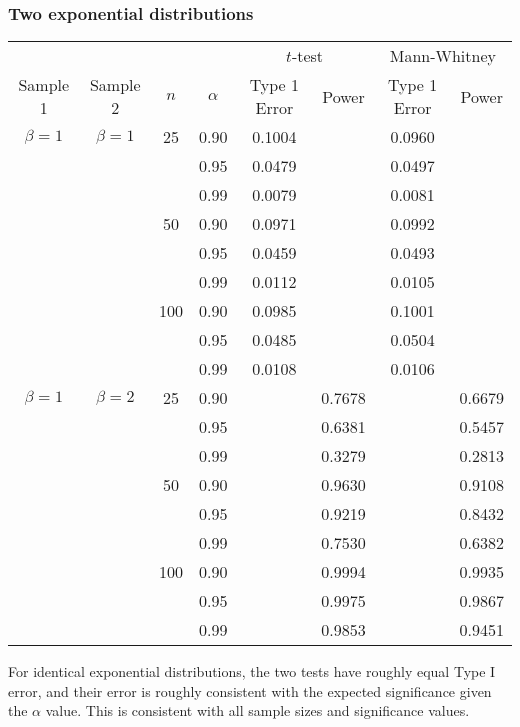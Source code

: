 \documentclass{article}
\begin{document}
\subsubsection*{Two exponential distributions}
\begin{center}
\begin{tabular}{ c c c c c c c c}
\hline
&&&&\multicolumn{2}{c}{$t$-test}&\multicolumn{2}{c}{Mann-Whitney}\\
Sample 1&Sample 2&$n$&$\alpha$&Type 1 Error&Power&Type 1 Error&Power\\
\hline
$\beta = 1$&$\beta =1$&25&0.90&0.1004&&0.0960\\
&&&0.95&0.0479&&0.0497\\
&&&0.99&0.0079&&0.0081\\
&&50&0.90&0.0971&&0.0992\\
&&&0.95&0.0459&&0.0493\\
&&&0.99&0.0112&&0.0105\\
&&100&0.90&0.0985&&0.1001\\
&&&0.95&0.0485&&0.0504\\
&&&0.99&0.0108&&0.0106\\
$\beta = 1$&$\beta =2$&25&0.90&&0.7678&&0.6679\\
&&&0.95&&0.6381&&0.5457\\
&&&0.99&&0.3279&&0.2813\\
&&50&0.90&&0.9630&&0.9108\\
&&&0.95&&0.9219&&0.8432\\
&&&0.99&&0.7530&&0.6382\\
&&100&0.90&&0.9994&&0.9935\\
&&&0.95&&0.9975&&0.9867\\
&&&0.99&&0.9853&&0.9451\\
\end{tabular}
\end{center}

For identical exponential distributions, the two tests have roughly equal Type I error, and their error is roughly consistent with the expected significance given the $\alpha$ value. This is consistent with all sample sizes and significance values. 
\end{document}
